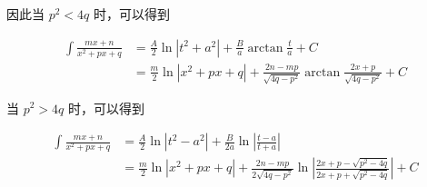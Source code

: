 因此当 $p^2<4q$ 时，可以得到

\begin{equation*}
    \begin{aligned}
        \int \frac{mx+n}{x^2+px+q} &= \frac{A}{2} \ln|t^2 + a^2| + \frac{B}{a}\arctan\frac{t}{a} + C\\
        &=\frac{m}{2}\ln|x^2+px+q| + \frac{2n-mp}{\sqrt{4q-p^2}}\arctan{\frac{2x+p}{\sqrt{4q-p^2}}} + C
    \end{aligned}
\end{equation*}

当 $p^2>4q$ 时，可以得到

\begin{equation*}
    \begin{aligned}
        \int \frac{mx+n}{x^2+px+q} &= \frac{A}{2} \ln|t^2 - a^2| + \frac{B}{2a}\ln\left|\frac{t-a}{t+a}\right|\\
        &=\frac{m}{2}\ln|x^2+px+q| + \frac{2n-mp}{2\sqrt{4q-p^2}}\ln\left| \frac{2x+p-\sqrt{p^2-4q}}{2x+p+\sqrt{p^2-4q}} \right| + C
    \end{aligned}
\end{equation*}
